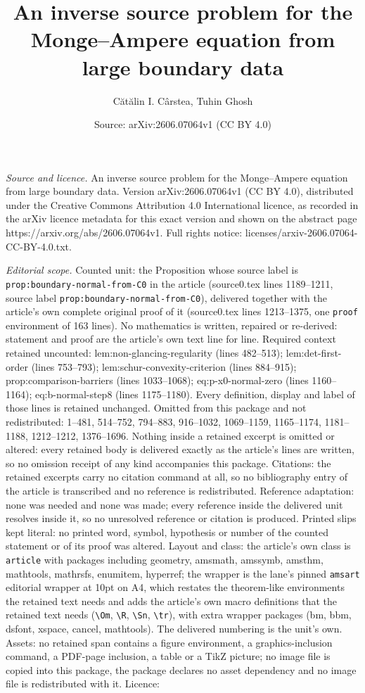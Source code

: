 \documentclass[10pt,a4paper]{amsart}
\title[An inverse source problem for the Monge--Ampere equation fro]{An inverse source problem for the Monge--Ampere equation from large boundary data}
\author{C\u{a}t\u{a}lin I. C\^arstea, Tuhin Ghosh}
\date{Source: arXiv:2606.07064v1 (CC BY 4.0)}
\begin{document}
\maketitle

\noindent\emph{Source and licence.} An inverse source problem for the Monge--Ampere equation from large boundary data. Version arXiv:2606.07064v1 (CC BY 4.0), distributed under the Creative Commons Attribution 4.0 International licence, as recorded in the arXiv licence metadata for this exact version and shown on the abstract page https://arxiv.org/abs/2606.07064v1. Full rights notice: licenses/arxiv-2606.07064-CC-BY-4.0.txt.\par\smallskip

\noindent\textit{Editorial scope.} Counted unit: the Proposition whose source label is \texttt{prop:boundary-normal-from-C0} in the article (source0.tex lines 1189--1211, source label \texttt{prop:boundary-normal-from-C0}), delivered together with the article's own complete original proof of it (source0.tex lines 1213--1375, one \texttt{proof} environment of 163 lines). No mathematics is written, repaired or re-derived: statement and proof are the article's own text line for line. Required context retained uncounted: lem:non-glancing-regularity (lines 482--513); lem:det-first-order (lines 753--793); lem:schur-convexity-criterion (lines 884--915); prop:comparison-barriers (lines 1033--1068); eq:p-x0-normal-zero (lines 1160--1164); eq:b-normal-step8 (lines 1175--1180). Every definition, display and label of those lines is retained unchanged. Omitted from this package and not redistributed: 1--481, 514--752, 794--883, 916--1032, 1069--1159, 1165--1174, 1181--1188, 1212--1212, 1376--1696. Nothing inside a retained excerpt is omitted or altered: every retained body is delivered exactly as the article's lines are written, so no omission receipt of any kind accompanies this package. Citations: the retained excerpts carry no citation command at all, so no bibliography entry of the article is transcribed and no reference is redistributed. Reference adaptation: none was needed and none was made; every reference inside the delivered unit resolves inside it, so no unresolved reference or citation is produced. Printed slips kept literal: no printed word, symbol, hypothesis or number of the counted statement or of its proof was altered. Layout and class: the article's own class is \texttt{article} with packages including geometry, amsmath, amssymb, amsthm, mathtools, mathrsfs, enumitem, hyperref; the wrapper is the lane's pinned \texttt{amsart} editorial wrapper at 10pt on A4, which restates the theorem-like environments the retained text needs and adds the article's own macro definitions that the retained text needs (\texttt{\textbackslash Om}, \texttt{\textbackslash R}, \texttt{\textbackslash Sn}, \texttt{\textbackslash tr}), with extra wrapper packages (bm, bbm, dsfont, xspace, cancel, mathtools). The delivered numbering is the unit's own. Assets: no retained span contains a figure environment, a graphics-inclusion command, a PDF-page inclusion, a table or a TikZ picture; no image file is copied into this package, the package declares no asset dependency and no image file is redistributed with it. Licence: 
\end{document}
